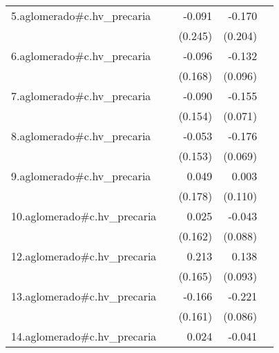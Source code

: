 {\begin{longtable}{l*{4}{D{.}{.}{-1}}}
\addlinespace
5.aglomerado#c.hv\_precaria&                     &      -0.091         &      -0.170         &                     \\
            &                     &     (0.245)         &     (0.204)         &                     \\
\addlinespace
6.aglomerado#c.hv\_precaria&                     &      -0.096         &      -0.132         &                     \\
            &                     &     (0.168)         &     (0.096)         &                     \\
\addlinespace
7.aglomerado#c.hv\_precaria&                     &      -0.090         &      -0.155\sym{*}  &                     \\
            &                     &     (0.154)         &     (0.071)         &                     \\
\addlinespace
8.aglomerado#c.hv\_precaria&                     &      -0.053         &      -0.176\sym{*}  &                     \\
            &                     &     (0.153)         &     (0.069)         &                     \\
\addlinespace
9.aglomerado#c.hv\_precaria&                     &       0.049         &       0.003         &                     \\
            &                     &     (0.178)         &     (0.110)         &                     \\
\addlinespace
10.aglomerado#c.hv\_precaria&                     &       0.025         &      -0.043         &                     \\
            &                     &     (0.162)         &     (0.088)         &                     \\
\addlinespace
12.aglomerado#c.hv\_precaria&                     &       0.213         &       0.138         &                     \\
            &                     &     (0.165)         &     (0.093)         &                     \\
\addlinespace
13.aglomerado#c.hv\_precaria&                     &      -0.166         &      -0.221\sym{**} &                     \\
            &                     &     (0.161)         &     (0.086)         &                     \\
\addlinespace
14.aglomerado#c.hv\_precaria&                     &       0.024         &      -0.041         &                     \\

\end{longtable}}

